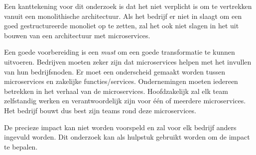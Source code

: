 Een kanttekening voor dit onderzoek is dat het niet verplicht is om te vertrekken vanuit een monolithische architectuur. Als het bedrijf er niet in slaagt om een goed gestructureerde monoliet op te zetten, zal het ook niet slagen in het uit bouwen van een architectuur met microservices.  ~\autocite{Tilkov2015}

Een goede voorbereiding is een \emph{must} om een goede transformatie te kunnen uitvoeren. Bedrijven moeten zeker zijn dat microservices helpen met het invullen van hun bedrijfsnoden. Er moet een onderscheid gemaakt worden tussen microservices en zakelijke functies/services. Ondernemingen moeten iedereen betrekken in het verhaal van de microservices. Hoofdzakelijk zal elk team zelfstandig werken en verantwoordelijk zijn voor één of meerdere microservices. Het bedrijf bouwt dus best zijn teams rond deze microservices. 

De precieze impact kan niet worden voorspeld en zal voor elk bedrijf anders ingevuld worden. Dit onderzoek kan als hulpstuk gebruikt worden om de impact te bepalen.





 
